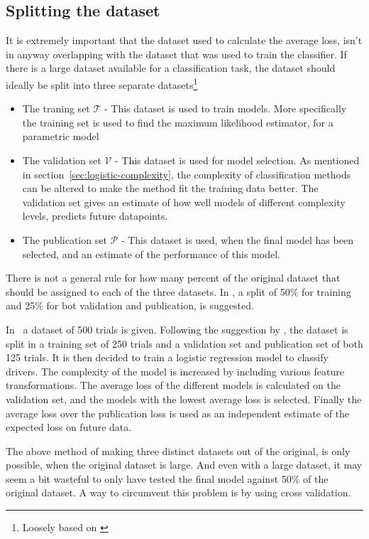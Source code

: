 \subsection{Splitting the dataset}\label{sec:splitting-dataset}
It is extremely important that the dataset used to calculate the average loss, isn't in anyway overlapping with the dataset that was used to train the classifier. If there is a large dataset available for a classification task, the dataset should ideally be split into three separate datasets\footnote{Loosely based on \citet[p.222]{hastie09}}
\begin{itemize}
    \item The traning set $\mathcal{T}$ - This dataset is used to train models. More specifically the training set is used to find the maximum likelihood estimator, for a parametric model
    \item The validation set $\mathcal{V}$ - This dataset is used for model selection.  As mentioned in section~\ref{sec:logistic-complexity}, the complexity of classification methods can be altered to make the method fit the training data better. The validation set gives an estimate of how well models of different complexity levels, predicts future datapoints.
    \item The publication set $\mathcal{P}$ - This dataset is used, when the final model has been selected, and an estimate of the performance of this model. 
\end{itemize}
There is not a general rule for how many percent of the original dataset that should be assigned to each of the three datasets. In \citet[p.222]{hastie09}, a split of 50\% for training and 25\% for bot validation and publication, is suggested.
\begin{Exa}
    In \TFC\ a dataset of 500 trials is given. Following the suggestion by \citet{hastie09}, the dataset is split in a training set of 250 trials and a validation set and publication set of both 125 trials. It is then decided to train a logistic regression model to classify drivers. The complexity of the model is increased by including various feature transformations. The average loss of the different models is calculated on the validation set, and the models with the lowest average loss is selected. Finally the average loss over the publication loss is used as an independent estimate of the expected loss on future data.
\end{Exa}
The above method of making three distinct datasets out of the original, is only possible, when the original dataset is large. And even with a large dataset, it may seem a bit wasteful to only have tested the final model against 50\% of the original dataset. A way to circumvent this problem is by using cross validation.

